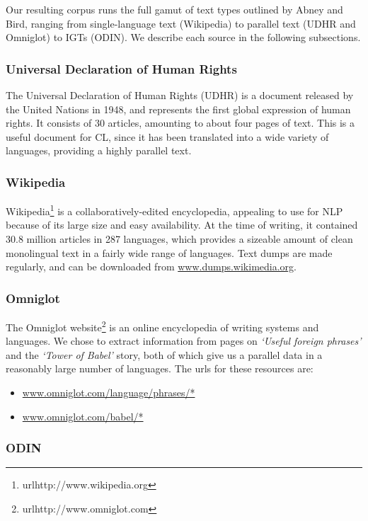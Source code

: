 Our resulting corpus runs the full gamut of text types outlined by Abney and Bird, ranging from single-language text (Wikipedia) to parallel text (UDHR and Omniglot) to IGTs (ODIN).  We describe each source in the following subsections.


\subsubsection{Universal Declaration of Human Rights}

The Universal Declaration of Human Rights (UDHR) is a document released by the United Nations in 1948, and represents the first global expression of human rights. It consists of 30 articles, amounting to about four pages of text. This is a useful document for CL, since it has been translated into a wide variety of languages, providing a highly parallel text.


\subsubsection{Wikipedia}

Wikipedia\footnote{url{http://www.wikipedia.org}} is a collaboratively-edited encyclopedia, appealing to use for NLP because of its large size and easy availability. At the time of writing, it contained 30.8 million articles in 287 languages, which provides a sizeable amount of clean monolingual text in a fairly wide range of languages. Text dumps are made regularly, and can be downloaded from \url{www.dumps.wikimedia.org}.

\subsubsection{Omniglot}

The Omniglot website\footnote{url{http://www.omniglot.com}} is an online encyclopedia of writing systems and languages. We chose to extract information from pages on \emph{`Useful foreign phrases'} and the \emph{`Tower of Babel'} story, both of which give us a parallel data in a reasonably large number of languages. The urls for these resources are:

\begin{itemize}[noitemsep]
\item \url{www.omniglot.com/language/phrases/*} 
\item \url{www.omniglot.com/babel/*}
\end{itemize}

\subsubsection{ODIN} \label{sec:odin}

